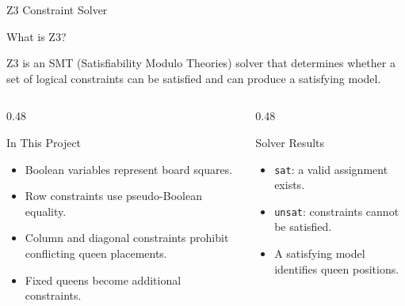\documentclass[aspectratio=169,12pt]{beamer}
\begin{document}

\begin{frame}{Z3 Constraint Solver}
\vspace{-0.3cm}
\begin{block}{What is Z3?}

Z3 is an SMT (Satisfiability Modulo Theories) solver that
determines whether a set of logical constraints can be
satisfied and can produce a satisfying model.
\end{block}
\vspace{-0.3cm}
\begin{columns}[T,totalwidth=\textwidth]

\begin{column}{0.48\textwidth}
\vspace{-0.3cm}
\begin{block}{In This Project}

\begin{itemize}
    \item Boolean variables represent board squares.
    \item Row constraints use pseudo-Boolean equality.
    \item Column and diagonal constraints prohibit
          conflicting queen placements.
    \item Fixed queens become additional constraints.
\end{itemize}

\end{block}

\end{column}

\begin{column}{0.48\textwidth}

\begin{exampleblock}{Solver Results}

\begin{itemize}
    \item \texttt{sat}: a valid assignment exists.
    \item \texttt{unsat}: constraints cannot be satisfied.
    \item A satisfying model identifies queen positions.
\end{itemize}

\end{exampleblock}

\end{column}

\end{columns}

\end{frame}
\end{document}
